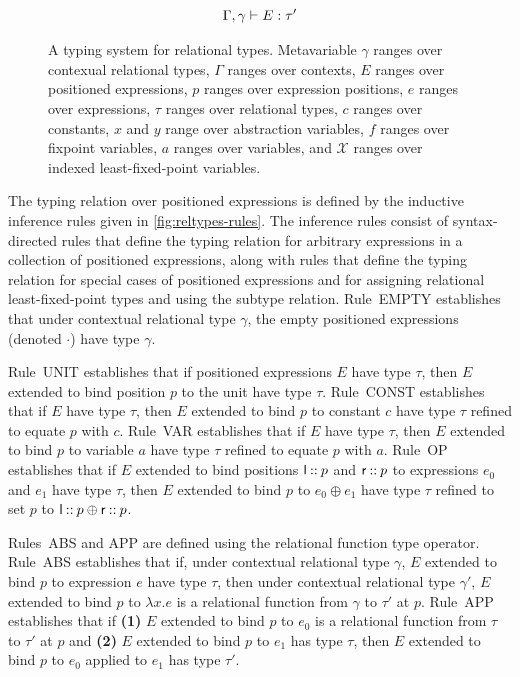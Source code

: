 \begin{figure}
\begin{gather*}
{      %
      \Gamma, \gamma \judges E : \tau' }
  \end{gather*}
  \caption{A typing system for relational types.
    Metavariable %
    $\gamma$ ranges over contexual relational types, %
    $\Gamma$ ranges over contexts, %
    $E$ ranges over positioned expressions, %
    $p$ ranges over expression positions, %
    $e$ ranges over expressions, %
    $\tau$ ranges over relational types, %
    $c$ ranges over constants, %
    $x$ and $y$ range over abstraction variables, %
    $f$ ranges over fixpoint variables, %
    $a$ ranges over variables, and
    $\mathcal{X}$ ranges over indexed least-fixed-point variables. }
  \label{fig:reltypes-rules}
\end{figure}

The typing relation over positioned expressions is defined by the
inductive inference rules given in \autoref{fig:reltypes-rules}.
%
The inference rules consist of syntax-directed rules that define the
typing relation for arbitrary expressions in a collection of
positioned expressions, along with rules that define the typing
relation for special cases of positioned expressions and for assigning
relational least-fixed-point types and using the subtype relation.
Rule~EMPTY establishes that under contextual relational type $\gamma$,
the empty positioned expressions (denoted $\cdot$) have type $\gamma$.

Rule~UNIT establishes that if positioned expressions $E$ have type
$\tau$, then $E$ extended to bind position $p$ to the unit have type
$\tau$.
Rule~CONST establishes that if $E$ have type $\tau$, then $E$ extended
to bind $p$ to constant $c$ have type $\tau$ refined to equate $p$
with $c$.
Rule~VAR establishes that if $E$ have type $\tau$, then $E$ extended
to bind $p$ to variable $a$ have type $\tau$ refined to equate $p$
with $a$.
Rule~OP establishes that if $E$ extended to bind positions
$\mathsf{l} \mathbin{::} p$ and $\mathsf{r} \mathbin{::} p$ to expressions $e_0$
and $e_1$ have type $\tau$, then $E$ extended to bind $p$ to
$e_0 \oplus e_1$ have type $\tau$ refined to set $p$ to
$\mathsf{l} \mathbin{::} p \oplus \mathsf{r} \mathbin{::} p$.

Rules~ABS and APP are defined using the relational function type
operator.
%
Rule~ABS establishes that if, under contextual relational type
$\gamma$, $E$ extended to bind $p$ to expression $e$ have type $\tau$,
then under contextual relational type $\gamma'$, $E$ extended to bind
$p$ to $\lambda x. e$ is a relational function from $\gamma$ to
$\tau'$ at $p$.
Rule~APP establishes that if %
\textbf{(1)} $E$ extended to bind $p$ to $e_0$ is a relational
function from $\tau$ to $\tau'$ at $p$ and %
\textbf{(2)} $E$ extended to bind $p$ to $e_1$ has type $\tau$, then
$E$ extended to bind $p$ to $e_0$ applied to $e_1$ has type $\tau'$.

